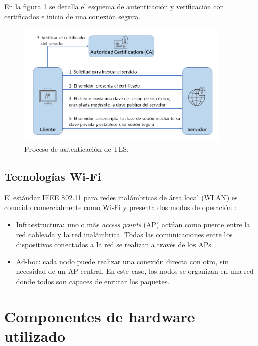 En la figura \ref{fig:ssl2way} se detalla el esquema de autenticación y verificación con certificados e inicio de una conexión segura.

\begin{figure}[h]
	\centering
	\includegraphics[width=0.9\textwidth]{./Figures/tls.png}
	\caption[Proceso de autenticación de TLS]{Proceso de autenticación de TLS\protect\footnotemark.}
	\label{fig:ssl2way}

\end{figure}

\subsection{Tecnologías Wi-Fi}
\label{sec:Tecnologías Wi-Fi}
El estándar IEEE 802.11 para redes inalámbricas de área local (WLAN) es conocido comercialmente como Wi-Fi y presenta dos modos de operación \citep{wifi}:
\begin{itemize}
\item Infraestructura: uno o más \textit{access points} (AP) actúan como puente entre la red cableada y la red inalámbrica. Todas las comunicaciones entre los dispositivos conectados a la red se realizan a través de los APs. 
\item Ad-hoc: cada nodo puede realizar una conexión directa con otro, sin necesidad de un AP central. En este caso, los nodos se organizan en una red donde todos son capaces de enrutar los paquetes.  
\end{itemize}

\section{Componentes de hardware utilizado}
\label{sec:Hardware utilizado}

